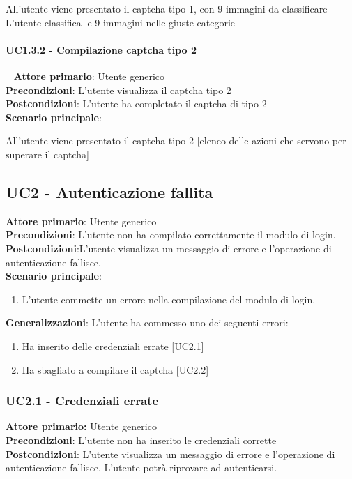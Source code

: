 All'utente viene presentato il captcha tipo 1, con 9 immagini da classificare\\
L'utente classifica le 9 immagini nelle giuste categorie


\paragraph{UC1.3.2 - Compilazione captcha tipo 2}~\smallskip
\textbf{Attore primario}: Utente generico\\
\textbf{Precondizioni}: L'utente visualizza il captcha tipo 2\\
\textbf{Postcondizioni}: L'utente ha completato il captcha di tipo 2\\
\textbf{Scenario principale}:

All'utente viene presentato il captcha tipo 2
[elenco delle azioni che servono per superare il captcha]

\subsection{UC2 - Autenticazione fallita}
\textbf{Attore primario}: Utente generico\\
\textbf{Precondizioni}: L’utente non ha compilato correttamente il modulo di login.\\
\textbf{Postcondizioni}:L’utente visualizza un messaggio di errore e l’operazione di autenticazione fallisce.\\

\textbf{Scenario principale}:
\begin{enumerate}
   \item L’utente commette un errore nella compilazione del modulo di login.
\end{enumerate}

\textbf{Generalizzazioni}: L'utente ha commesso uno dei seguenti errori:
\begin{enumerate}
	\item Ha inserito delle credenziali errate [UC2.1]
	\item Ha sbagliato a compilare il captcha [UC2.2]
\end{enumerate}

\subsubsection{UC2.1 - Credenziali errate}
\textbf{Attore primario:} Utente generico\\
\textbf{Precondizioni}: L’utente non ha inserito le credenziali corrette\\
\textbf{Postcondizioni}:  L’utente visualizza un messaggio di errore e l’operazione di autenticazione fallisce. L’utente potrà riprovare  ad autenticarsi.\\

